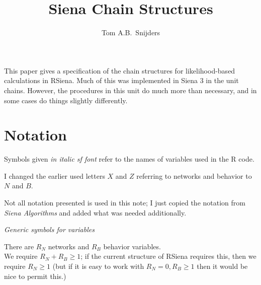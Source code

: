 \documentclass[a4paper,fleqn,12pt]{article}
\title{Siena Chain Structures}
\author{Tom A.B.\ Snijders }
\newcommand{\nnm}[1]{\textsf{\small\textit{#1}}}
\newcommand{\R}{{\sf R }}
\begin{document}
\maketitle

This paper gives a specification of the
chain structures for likelihood-based calculations in RSiena.
Much of this was implemented in Siena 3 in the unit \textsf{chains}.
However, the procedures in this unit do much more than necessary,
and in some cases do things slightly differently.

\section{Notation}


Symbols given \nnm{in italic sf font} refer to the names
of variables used in the \R code.

I changed the earlier used letters $X$ and $Z$ referring to networks and behavior
to $N$ and $B$.

Not all notation presented is used in this note;
I just copied the notation from \emph{Siena Algorithms}
and added what was needed additionally.

\emph{Generic symbols for variables}

There are $R_N$ networks and $R_B$ behavior variables.\\
We require $R_N + R_B \geq 1$; if the current structure of RSiena
requires this, then we require $R_N \geq 1$ (but if it is easy to
work with $R_N = 0, R_B \geq 1$ then it would be nice to permit this.)
\end{document}
